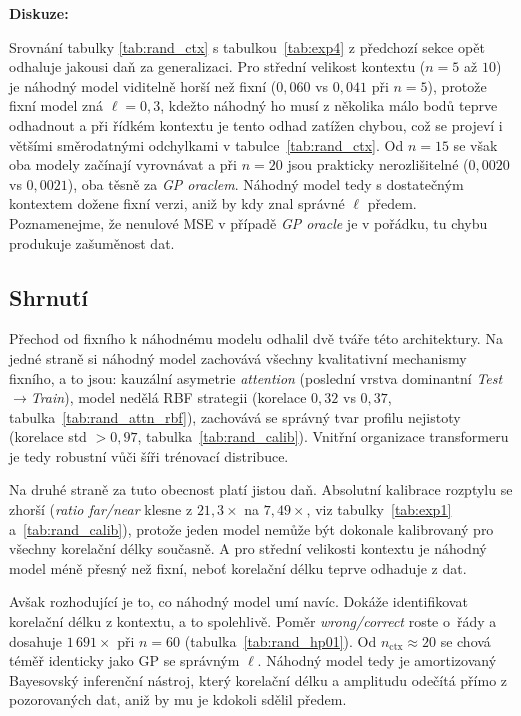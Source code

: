 \textbf{Diskuze:}

Srovnání tabulky \ref{tab:rand_ctx} s tabulkou~\ref{tab:exp4} z předchozí sekce opět odhaluje jakousi daň za generalizaci.
Pro střední velikost kontextu ($n = 5$ až $10$) je náhodný model viditelně horší než fixní ($0{,}060$ vs $0{,}041$ při $n = 5$), protože fixní model zná $\ell = 0{,}3$, kdežto náhodný ho musí z několika málo bodů teprve odhadnout a při řídkém kontextu je tento odhad zatížen chybou, což se projeví i většími směrodatnými odchylkami v tabulce~\ref{tab:rand_ctx}.
Od $n = 15$ se však oba modely začínají vyrovnávat a při $n = 20$ jsou prakticky nerozlišitelné ($0{,}0020$ vs $0{,}0021$), oba těsně za \emph{GP oraclem}.
Náhodný model tedy s dostatečným kontextem dožene fixní verzi, aniž by kdy znal správné $\ell$ předem.
Poznamenejme, že nenulové MSE v případě \textit{GP oracle} je v pořádku, tu chybu produkuje zašuměnost dat.

\subsection{Shrnutí}
\label{subsec:shrnuti-random-hp}

Přechod od fixního k náhodnému modelu odhalil dvě tváře této architektury.
Na jedné straně si náhodný model zachovává všechny kvalitativní mechanismy fixního, a to jsou: kauzální asymetrie \emph{attention} (poslední vrstva dominantní \textit{Test$\to$Train}), model nedělá RBF strategii (korelace $0{,}32$ vs $0{,}37$, tabulka~\ref{tab:rand_attn_rbf}), zachovává se správný tvar profilu nejistoty (korelace std $> 0{,}97$, tabulka~\ref{tab:rand_calib}).
Vnitřní organizace transformeru je tedy robustní vůči šíři trénovací distribuce.
\par

Na druhé straně za tuto obecnost platí jistou daň.
Absolutní kalibrace rozptylu se zhorší (\textit{ratio far/near} klesne z $21{,}3\times$ na $7{,}49\times$, viz tabulky~\ref{tab:exp1} a~\ref{tab:rand_calib}), protože jeden model nemůže být dokonale kalibrovaný pro všechny korelační délky současně.
A pro střední velikosti kontextu je náhodný model méně přesný než fixní, neboť korelační délku teprve odhaduje z dat.
\par

Avšak rozhodující je to, co náhodný model umí navíc.
Dokáže identifikovat korelační délku z kontextu, a to spolehlivě.
Poměr \emph{wrong/correct} roste o~řády a dosahuje $1\,691\times$ při $n = 60$ (tabulka~\ref{tab:rand_hp01}).
Od $n_{\text{ctx}} \approx 20$ se chová téměř identicky jako GP se správným $\ell$.
Náhodný model tedy je amortizovaný Bayesovský inferenční nástroj, který korelační délku a amplitudu odečítá přímo z pozorovaných dat, aniž by mu je kdokoli sdělil předem.

